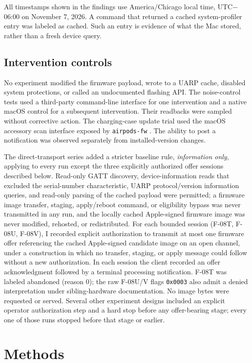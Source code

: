 \documentclass[11pt,letterpaper]{article}
\begin{document}
All timestamps shown in the findings use America/Chicago local time, UTC$-$06:00 on November 7, 2026. A command that returned a cached system-profiler entry was labeled as cached. Such an entry is evidence of what the Mac stored, rather than a fresh device query.

\subsection{Intervention controls}
No experiment modified the firmware payload, wrote to a UARP cache, disabled system protections, or called an undocumented flashing API. The noise-control tests used a third-party command-line interface for one intervention and a native macOS control for a subsequent intervention. Their readbacks were sampled without corrective action. The charging-case update trial used the macOS accessory scan interface exposed by \texttt{airpods-fw} \cite{airpodsfw}. The ability to post a notification was observed separately from installed-version changes.

The direct-transport series added a stricter baseline rule, \emph{information only}, applying to every run except the three explicitly authorized offer sessions described below. Read-only GATT discovery, device-information reads that excluded the serial-number characteristic, UARP protocol/version information queries, and read-only parsing of the cached payload were permitted; a firmware image transfer, staging, apply/reboot command, or eligibility bypass was never transmitted in any run, and the locally cached Apple-signed firmware image was never modified, rehosted, or redistributed. For each bounded session (F-08T, F-08U, F-08V), I recorded explicit authorization to transmit at most one firmware offer referencing the cached Apple-signed candidate image on an open channel, under a construction in which no transfer, staging, or apply message could follow without a new authorization. In each session the client recorded an offer acknowledgment followed by a terminal processing notification. F-08T was labeled abandoned (reason 0); the raw F-08U/V flags \texttt{0x0003} also admit a denied interpretation under sibling-hardware documentation. No image bytes were requested or served. Several other experiment designs included an explicit operator authorization step and a hard stop before any offer-bearing stage; every one of those runs stopped before that stage or earlier.

\section{Methods}\label{sec:methods}
\end{document}
